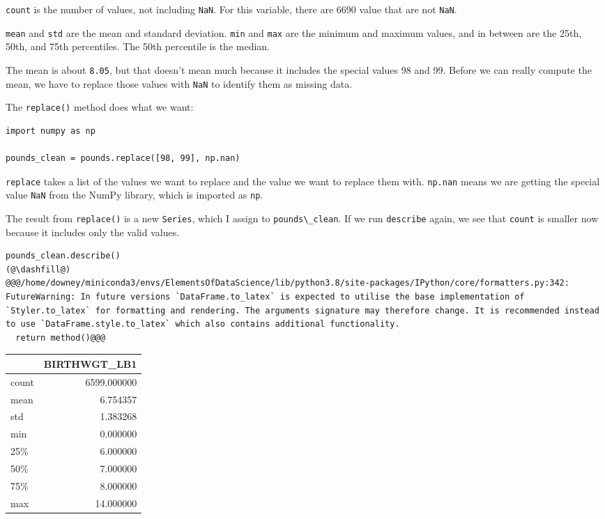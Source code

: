\passthrough{\lstinline!count!} is the number of values, not including
\passthrough{\lstinline!NaN!}. For this variable, there are 6690 value
that are not \passthrough{\lstinline!NaN!}.

\passthrough{\lstinline!mean!} and \passthrough{\lstinline!std!} are the
mean and standard deviation. \passthrough{\lstinline!min!} and
\passthrough{\lstinline!max!} are the minimum and maximum values, and in
between are the 25th, 50th, and 75th percentiles. The 50th percentile is
the median.

The mean is about \passthrough{\lstinline!8.05!}, but that doesn't mean
much because it includes the special values 98 and 99. Before we can
really compute the mean, we have to replace those values with
\passthrough{\lstinline!NaN!} to identify them as missing data.

The \passthrough{\lstinline!replace()!} method does what we want:

\begin{lstlisting}[]
import numpy as np

pounds_clean = pounds.replace([98, 99], np.nan)
\end{lstlisting}

\passthrough{\lstinline!replace!} takes a list of the values we want to
replace and the value we want to replace them with.
\passthrough{\lstinline!np.nan!} means we are getting the special value
\passthrough{\lstinline!NaN!} from the NumPy library, which is imported
as \passthrough{\lstinline!np!}.

The result from \passthrough{\lstinline!replace()!} is a new
\passthrough{\lstinline!Series!}, which I assign to
\passthrough{\lstinline!pounds\_clean!}. If we run
\passthrough{\lstinline!describe!} again, we see that
\passthrough{\lstinline!count!} is smaller now because it includes only
the valid values.

\begin{lstlisting}[]
pounds_clean.describe()
(@\dashfill@)
@@@/home/downey/miniconda3/envs/ElementsOfDataScience/lib/python3.8/site-packages/IPython/core/formatters.py:342: FutureWarning: In future versions `DataFrame.to_latex` is expected to utilise the base implementation of `Styler.to_latex` for formatting and rendering. The arguments signature may therefore change. It is recommended instead to use `DataFrame.style.to_latex` which also contains additional functionality.
  return method()@@@
\end{lstlisting}

\begin{tabular}{lr}
\midrule
{} &  BIRTHWGT\_LB1 \\
\midrule
count &   6599.000000 \\
mean  &      6.754357 \\
std   &      1.383268 \\
min   &      0.000000 \\
25\%   &      6.000000 \\
50\%   &      7.000000 \\
75\%   &      8.000000 \\
max   &     14.000000 \\
\midrule
\end{tabular}

